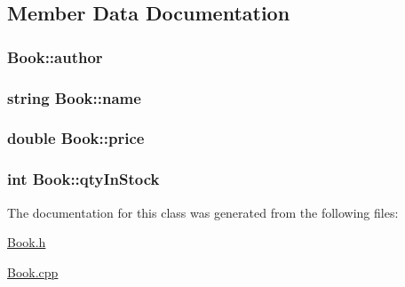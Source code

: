 \subsection{Member Data Documentation}
\subsubsection[{\texorpdfstring{author}{author}}]{ Book\+::author\hspace{0.3cm}{\ttfamily [private]}}\hypertarget{classBook_a1c84f2a0d3db51a0c65f061c91096053}{}\label{classBook_a1c84f2a0d3db51a0c65f061c91096053}
\subsubsection[{\texorpdfstring{name}{name}}]{\setlength{\rightskip}{0pt plus 5cm}string Book\+::name\hspace{0.3cm}{\ttfamily [private]}}\hypertarget{classBook_a9afedb80b692466dc2d91f109970a32c}{}\label{classBook_a9afedb80b692466dc2d91f109970a32c}
\subsubsection[{\texorpdfstring{price}{price}}]{\setlength{\rightskip}{0pt plus 5cm}double Book\+::price\hspace{0.3cm}{\ttfamily [private]}}\hypertarget{classBook_afa8e149d0bfb4372166d0ccfe8aa30b7}{}\label{classBook_afa8e149d0bfb4372166d0ccfe8aa30b7}
\subsubsection[{\texorpdfstring{qty\+In\+Stock}{qtyInStock}}]{\setlength{\rightskip}{0pt plus 5cm}int Book\+::qty\+In\+Stock\hspace{0.3cm}{\ttfamily [private]}}\hypertarget{classBook_ae828efa39fa83ff5a8dc3c66e78454e2}{}\label{classBook_ae828efa39fa83ff5a8dc3c66e78454e2}


The documentation for this class was generated from the following files\+:\begin{DoxyCompactItemize}
\item 
\hyperlink{Book_8h}{Book.\+h}\item 
\hyperlink{Book_8cpp}{Book.\+cpp}\end{DoxyCompactItemize}
